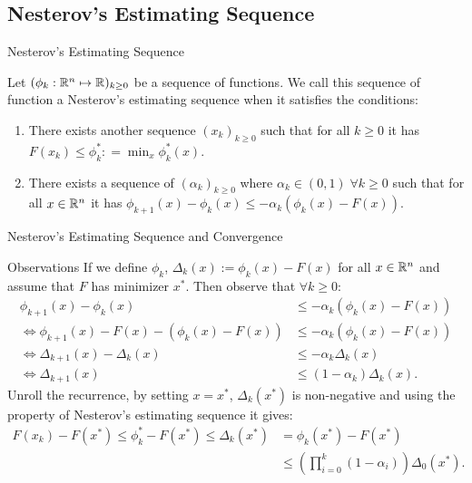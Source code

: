 \documentclass[11pt]{beamer}
\begin{document}
    \subsection{Nesterov's Estimating Sequence}
        \begin{frame}{Nesterov's Estimating Sequence}            
            \begin{definition}\label{def:nes-est-seq}
                Let $(\phi_k : \mathbb R^n \mapsto \mathbb R)_{k \ge 0}$ be a sequence of functions. 
                We call this sequence of function a Nesterov's estimating sequence when it satisfies the conditions: 
                \begin{enumerate}
                    \item There exists another sequence $(x_k)_{k \ge 0}$ such that for all $k \ge 0$ it has $F(x_k) \le \phi_k^*: =\min_{x}\phi_k^*(x)$. 
                    \item There exists a sequence of $(\alpha_k)_{k \ge 0}$ where $\alpha_k \in (0, 1)\; \forall k \ge0 $ such that for all $x \in \mathbb R^n$ it has $\phi_{k + 1}(x) - \phi_k(x) \le - \alpha_k(\phi_k(x) - F(x))$. 
                \end{enumerate}
            \end{definition}
        \end{frame}
        \begin{frame}{Nesterov's Estimating Sequence and Convergence}
            \begin{block}{Observations}
                {\small
                If we define $\phi_k$, $\Delta_k(x) := \phi_k (x) - F(x)$ for all $x \in \mathbb R^n$ and assume that $F$ has minimizer $x^*$. 
                Then observe that $\forall k \ge 0$:  
                \begin{align*}
                    \phi_{k + 1}(x) - \phi_k(x) 
                    &\le - \alpha_k (\phi_k(x) - F(x))
                    \\
                    \iff 
                    \phi_{k + 1}(x) - F(x) - (\phi_k(x) - F(x))
                    &\le 
                    -\alpha_k(\phi_k(x) - F(x))
                    \\
                    \iff
                    \Delta_{k + 1}(x) - \Delta_k(x) &\le
                    - \alpha_k\Delta_k(x)
                    \\
                    \iff 
                    \Delta_{k + 1}(x) 
                    &\le 
                    (1 - \alpha_k)\Delta_k(x). 
                \end{align*}
                Unroll the recurrence, by setting $x = x^*$, $\Delta_k(x^*)$ is non-negative and using the property of Nesterov's estimating sequence it gives: 
                \begin{align*}
                    F(x_k) - F(x^*) \le \phi_k^* - F(x^*) \le \Delta_k(x^*) 
                    &= \phi_k(x^*) - F(x^*) 
                    \\
                    &\le \left(\prod_{i = 0}^k(1 - \alpha_i)\right)\Delta_0(x^*).
                \end{align*}
                }
            \end{block}
        \end{frame}
\end{document}
